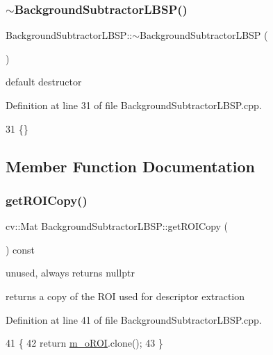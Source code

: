 \subsubsection{\texorpdfstring{$\sim$\+Background\+Subtractor\+L\+B\+S\+P()}{~BackgroundSubtractorLBSP()}}
{\footnotesize\ttfamily Background\+Subtractor\+L\+B\+S\+P\+::$\sim$\+Background\+Subtractor\+L\+B\+SP (\begin{DoxyParamCaption}{ }\end{DoxyParamCaption})\hspace{0.3cm}{\ttfamily [virtual]}}



default destructor 



Definition at line 31 of file Background\+Subtractor\+L\+B\+S\+P.\+cpp.


\begin{DoxyCode}
31 \{\}
\end{DoxyCode}


\subsection{Member Function Documentation}
\mbox{\label{class_background_subtractor_l_b_s_p_a9843f87f8adcd0e85274303f9210b883}} 
\subsubsection{\texorpdfstring{get\+R\+O\+I\+Copy()}{getROICopy()}}
{\footnotesize\ttfamily cv\+::\+Mat Background\+Subtractor\+L\+B\+S\+P\+::get\+R\+O\+I\+Copy (\begin{DoxyParamCaption}{ }\end{DoxyParamCaption}) const\hspace{0.3cm}{\ttfamily [virtual]}}



unused, always returns nullptr 

returns a copy of the R\+OI used for descriptor extraction 

Definition at line 41 of file Background\+Subtractor\+L\+B\+S\+P.\+cpp.


\begin{DoxyCode}
41                                                  \{
42     \textcolor{keywordflow}{return} \mbox{\hyperlink{class_background_subtractor_l_b_s_p_a53fe98bd2489d95de5292467145901e9}{m\_oROI}}.clone();
43 \}
\end{DoxyCode}
\mbox{\label{class_background_subtractor_l_b_s_p_ac6b854f94414497b143375d4a0ae8b6f}} 
